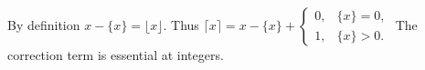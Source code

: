 By definition $x-\{x\}=\lfloor x\rfloor$. Thus $\boxed{\lceil x\rceil=x-\{x\}+\begin{cases}0,&\{x\}=0,\\1,&\{x\}>0.\end{cases}}$ The correction term is essential at integers.
